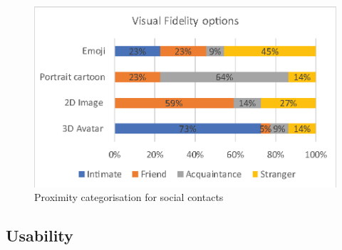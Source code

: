 
\begin{figure}[ht]
    \centering
    \includegraphics[width=.8\linewidth]{images/mgia17/analysis-images-01.eps}
    \caption{Proximity categorisation for social contacts}
    \label{fig:contacts:proximity}
\end{figure}

\subsection{Usability}


